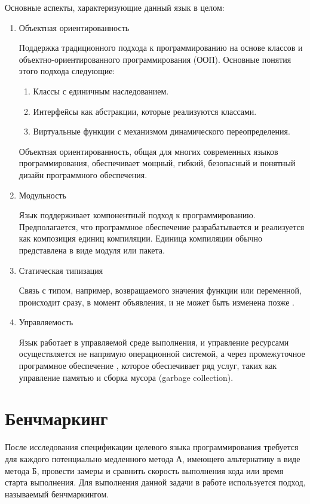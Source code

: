 \documentclass{mipt-thesis-bs}
\begin{document}
Основные аспекты, характеризующие данный язык в целом:

\begin{enumerate}
    \item Объектная ориентированность

    Поддержка традиционного подхода к программированию на основе классов и
    объектно-ориентированного программирования (ООП). Основные понятия этого подхода следующие:
    \begin{enumerate}
        \item Классы с единичным наследованием.
        \item Интерфейсы как абстракции, которые реализуются классами.
        \item Виртуальные функции с механизмом динамического переопределения.
    \end{enumerate}
    Объектная ориентированность, общая для многих современных языков программирования,
    обеспечивает мощный, гибкий, безопасный и понятный дизайн программного обеспечения.

    \item Модульность

    Язык поддерживает компонентный подход к программированию. Предполагается, что
    программное обеспечение разрабатывается и реализуется как композиция единиц
     компиляции. Единица компиляции обычно представлена в виде модуля или пакета.

    \item Статическая типизация

    Связь с типом, например, возвращаемого значения функции или переменной, происходит сразу, в момент объявления,
    и не может быть изменена позже \cite{eng-article}.

    \item Управляемость

    Язык работает в управляемой среде выполнения, и управление ресурсами осуществляется не напрямую
    операционной системой, а через промежуточное программное обеспечение \cite{eng-article}, которое обеспечивает ряд услуг,
    таких как управление памятью и сборка мусора (garbage collection).
\end{enumerate}
\section{Бенчмаркинг}

После исследования спецификации целевого языка программирования требуется для каждого
потенциально медленного метода А, имеющего альтернативу в виде метода Б, провести
замеры и сравнить скорость выполнения кода или время старта выполнения. Для выполнения
данной задачи в работе используется подход, называемый бенчмаркингом.
\end{document}
